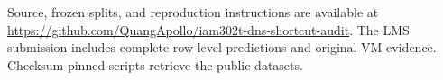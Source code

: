 Source, frozen splits, and reproduction instructions are available at \url{https://github.com/QuangApollo/iam302t-dns-shortcut-audit}. The LMS submission includes complete row-level predictions and original VM evidence. Checksum-pinned scripts retrieve the public datasets.
